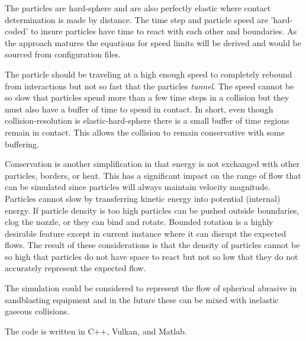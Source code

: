The particles are hard-sphere and are also perfectly elastic where contact determination is made by distance. The time step and particle speed are 'hard-coded' to insure particles have time to react with each other and boundaries. As the approach matures the equations for speed limits will be derived and would be sourced from configuration files.

The particle should be traveling at a high enough speed to completely rebound from interactions but not so fast that the particles \textit{tunnel}. The speed cannot be so slow that particles spend more than a few time steps in a collision but they must also have a buffer of time to spend in contact. In short, even though collision-resolution is elastic-hard-sphere there is a small buffer of time regions remain in contact. This allows the collision to remain conservative with some buffering. 

Conservation is another simplification in that energy is not exchanged with other particles, borders, or heat. This has a significant impact on the range of flow that can be simulated since particles will always maintain velocity magnitude. Particles cannot slow by transferring kinetic energy into potential (internal) energy. If particle density is too high particles can be pushed outside boundaries, clog the nozzle, or they can bind and rotate. Bounded rotation is a highly desirable feature except in current instance where it can disrupt the expected flows. The result of these considerations is that the density of particles cannot be so high that particles do not have space to react but not so low that they do not accurately represent the expected flow.

The simulation could be considered to represent the flow of spherical abrasive in sandblasting equipment and in the future these can be mixed with inelastic gaseous collisions.

The code is written in C++, Vulkan, and Matlab. 





